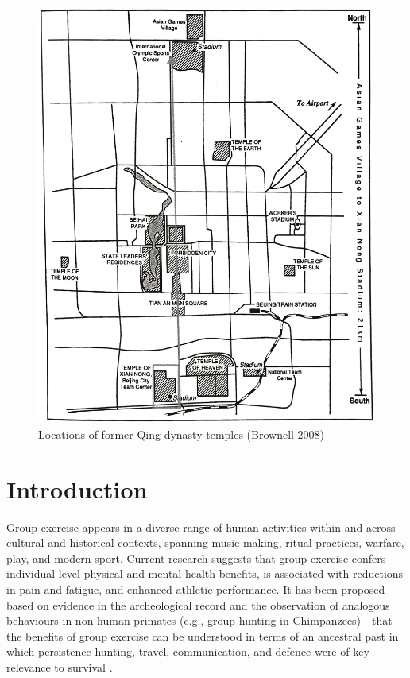 \begin{figure}[htbp]
  \includegraphics[width = \linewidth]{images/beijingTemplesXNT.png}
  \caption{Locations of former Qing dynasty temples (Brownell 2008)}
  \label{fig:beijingTemplesXNT}
\end{figure}


\section{Introduction}
Group exercise appears in a diverse range of human activities within and across cultural and historical contexts, spanning music making, ritual practices, warfare, play, and modern sport.  Current research suggests that group exercise confers individual-level physical and mental health benefits, is associated with reductions in pain and fatigue, and enhanced athletic performance. It has been proposed---based on evidence in the archeological record and the observation of analogous behaviours in non-human primates (e.g., group hunting in Chimpanzees)---that the benefits of group exercise can be understood in terms of an ancestral past in which persistence hunting, travel, communication, and defence were of key relevance to survival \citep{Sands2010}.

